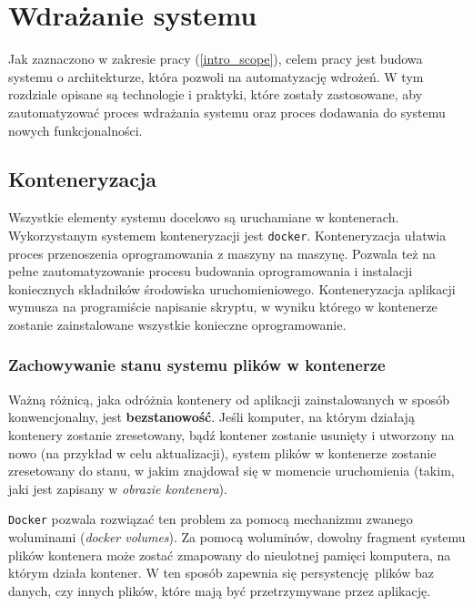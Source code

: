 \chapter{Wdrażanie systemu}

Jak zaznaczono w zakresie pracy (\ref{intro_scope}), celem pracy jest
budowa systemu o architekturze, która pozwoli na automatyzację wdrożeń.
W tym rozdziale opisane są technologie i praktyki, które zostały 
zastosowane, aby zautomatyzować proces wdrażania systemu oraz proces
dodawania do systemu nowych funkcjonalności.

\section{Konteneryzacja}

Wszystkie elementy systemu docelowo są uruchamiane w kontenerach.
Wykorzystanym systemem konteneryzacji jest \texttt{docker}\cite{docker}.
Konteneryzacja ułatwia proces przenoszenia oprogramowania 
z maszyny na maszynę. Pozwala też na pełne zautomatyzowanie
procesu budowania oprogramowania i instalacji koniecznych
składników środowiska uruchomieniowego. Konteneryzacja
aplikacji wymusza na programiście napisanie skryptu, w wyniku
którego w kontenerze zostanie zainstalowane wszystkie konieczne 
oprogramowanie.

\subsection{Zachowywanie stanu systemu plików w kontenerze} \label{volumes}

Ważną różnicą, jaka odróżnia kontenery od aplikacji zainstalowanych
w sposób konwencjonalny, jest \textbf{bezstanowość}. Jeśli komputer,
na którym działają kontenery zostanie zresetowany, bądź kontener zostanie
usunięty i utworzony na nowo (na przykład w celu aktualizacji), system
plików w kontenerze zostanie zresetowany do stanu, w jakim znajdował się 
w momencie uruchomienia (takim, jaki jest zapisany w \textit{obrazie kontenera}).

\texttt{Docker} pozwala rozwiązać ten problem za pomocą mechanizmu zwanego 
woluminami (\textit{docker volumes})\cite{docker_volumes}.
Za pomocą woluminów, dowolny fragment systemu
plików kontenera może zostać zmapowany do nieulotnej pamięci komputera, na którym 
działa kontener. W ten sposób zapewnia się persystencję plików baz danych, czy innych
plików, które mają być przetrzymywane przez aplikację.\\ %

